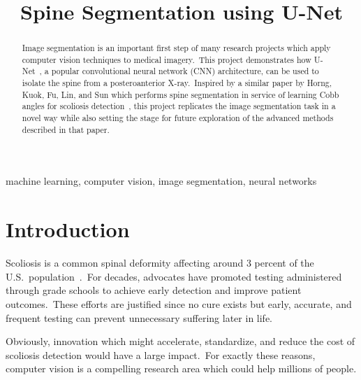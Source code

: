 \documentclass[conference]{IEEEtran}
\begin{document}
    \title{Spine Segmentation using U-Net}

    \author{
    }

    \maketitle

    \begin{abstract}
        Image segmentation is an important first step of many research projects which apply computer vision techniques to medical imagery.\ This project demonstrates how U-Net~\cite{ronneberger2015unet}, a popular convolutional neural network (CNN) architecture, can be used to isolate the spine from a posteroanterior X-ray.\ Inspired by a similar paper by Horng, Kuok, Fu, Lin, and Sun which performs spine segmentation in service of learning Cobb angles for scoliosis detection~\cite{cobb-angle-measurement-of-spine-from-x-ray-images-using-convolutional-neural-network}, this project replicates the image segmentation task in a novel way while also setting the stage for future exploration of the advanced methods described in that paper.
    \end{abstract}

    \begin{IEEEkeywords}
        machine learning, computer vision, image segmentation, neural networks
    \end{IEEEkeywords}

    \section{Introduction}\label{sec:introduction}

    Scoliosis is a common spinal deformity affecting around 3 percent of the U.S.\ population~\cite{scoliosis-media-and-community-guide}.\ For decades, advocates have promoted testing administered through grade schools to achieve early detection and improve patient outcomes.\ These efforts are justified since no cure exists but early, accurate, and frequent testing can prevent unnecessary suffering later in life.

    Obviously, innovation which might accelerate, standardize, and reduce the cost of scoliosis detection would have a large impact.\ For exactly these reasons, computer vision is a compelling research area which could help millions of people.
\end{document}

